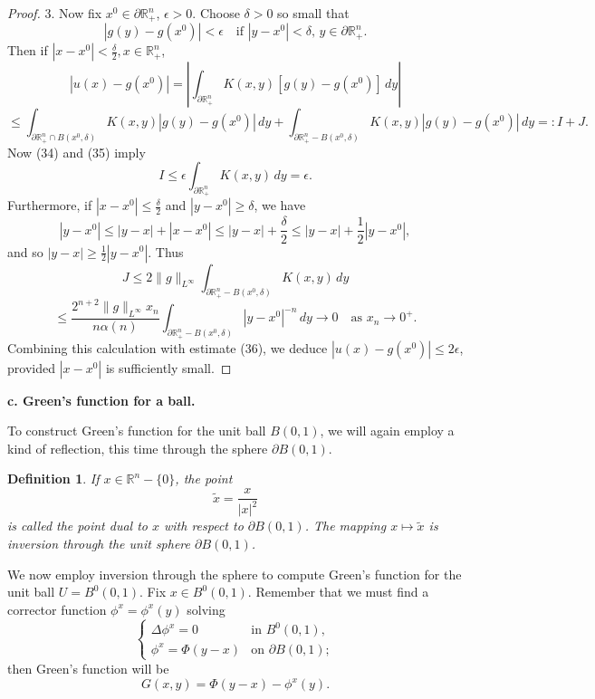 \documentclass[a4paper,12pt]{report}
\newtheorem{definition}{Definition}[section]
\begin{document}
\begin{proof}
3. Now fix \( x^0 \in \partial \mathbb{R}^n_+ \), \( \epsilon > 0 \). Choose \( \delta > 0 \) so small that
\begin{equation}
|g(y) - g(x^0)| < \epsilon \quad \text{if } |y - x^0| < \delta, \, y \in \partial \mathbb{R}^n_+. \tag{35}
\end{equation}
Then if \( |x - x^0| < \frac{\delta}{2}, x \in \mathbb{R}^n_+ \),
\[
|u(x) - g(x^0)| = \left| \int_{\partial \mathbb{R}^n_+} K(x, y) [g(y) - g(x^0)] \, dy \right|
\]
\[
\leq \int_{\partial \mathbb{R}^n_+ \cap B(x^0, \delta)} K(x, y) |g(y) - g(x^0)| \, dy
+ \int_{\partial \mathbb{R}^n_+ - B(x^0, \delta)} K(x, y) |g(y) - g(x^0)| \, dy =: I + J.
\]
Now (34) and (35) imply
\[
I \leq \epsilon \int_{\partial \mathbb{R}^n_+} K(x, y) \, dy = \epsilon.
\]
Furthermore, if \( |x - x^0| \leq \frac{\delta}{2} \) and \( |y - x^0| \geq \delta \), we have
\[
|y - x^0| \leq |y - x| + |x - x^0| \leq |y - x| + \frac{\delta}{2} \leq |y - x| + \frac{1}{2} |y - x^0|,
\]
and so \( |y - x| \geq \frac{1}{2} |y - x^0| \). Thus
\[
J \leq 2 \| g \|_{L^\infty} \int_{\partial \mathbb{R}^n_+ - B(x^0, \delta)} K(x, y) \, dy
\]
\[
\leq \frac{2^{n+2} \| g \|_{L^\infty} x_n}{n \alpha(n)} \int_{\partial \mathbb{R}^n_+ - B(x^0, \delta)} |y - x^0|^{-n} \, dy \to 0 \quad \text{as } x_n \to 0^+.
\]
Combining this calculation with estimate (36), we deduce \( |u(x) - g(x^0)| \leq 2 \epsilon \), provided \( |x - x^0| \) is sufficiently small.
\end{proof}
\noindent
\textbf{c. Green's function for a ball.}

To construct Green's function for the unit ball \( B(0, 1) \), we will again employ a kind of reflection, this time through the sphere \( \partial B(0, 1) \).

\begin{definition}
If \( x \in \mathbb{R}^n - \{ 0 \} \), the point
\[
\tilde{x} = \frac{x}{|x|^2}
\]
is called the point dual to \( x \) with respect to \( \partial B(0, 1) \). The mapping \( x \mapsto \tilde{x} \) is inversion through the unit sphere \( \partial B(0, 1) \).
\end{definition}

We now employ inversion through the sphere to compute Green's function for the unit ball \( U = B^0(0, 1) \). Fix \( x \in B^0(0, 1) \). Remember that we must find a corrector function \( \phi^x = \phi^x(y) \) solving
\[
\begin{cases}
    \Delta \phi^x = 0 & \text{in } B^0(0, 1), \\
    \phi^x = \Phi(y - x) & \text{on } \partial B(0, 1);
\end{cases} \tag{37}
\]
then Green's function will be
\[
G(x, y) = \Phi(y - x) - \phi^x(y). \tag{38}
\]
\end{document}
